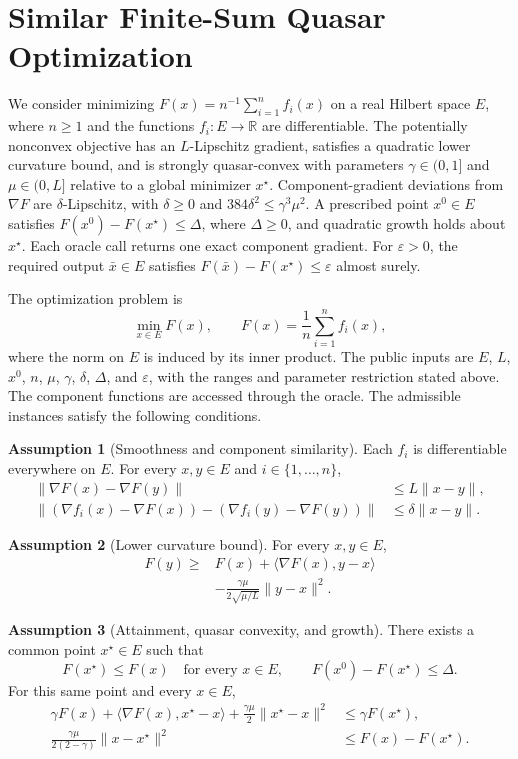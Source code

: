 \documentclass[10pt]{article}
\theoremstyle{definition}
\newtheorem{assumption}{Assumption}
\begin{document}
\section*{Similar Finite-Sum Quasar Optimization}
We consider minimizing $F(x)=n^{-1}\sum_{i=1}^{n}f_i(x)$ on a real Hilbert space $E$, where $n\geq1$ and the functions $f_i:E\to\mathbb{R}$ are differentiable. The potentially nonconvex objective has an $L$-Lipschitz gradient, satisfies a quadratic lower curvature bound, and is strongly quasar-convex with parameters $\gamma\in(0,1]$ and $\mu\in(0,L]$ relative to a global minimizer $x^\star$. Component-gradient deviations from $\nabla F$ are $\delta$-Lipschitz, with $\delta\geq0$ and $384\delta^2\leq\gamma^3\mu^2$. A prescribed point $x^0\in E$ satisfies $F(x^0)-F(x^\star)\leq\Delta$, where $\Delta\geq0$, and quadratic growth holds about $x^\star$. Each oracle call returns one exact component gradient. For $\varepsilon>0$, the required output $\bar{x}\in E$ satisfies $F(\bar{x})-F(x^\star)\leq\varepsilon$ almost surely.

The optimization problem is
\[
\min_{x\in E} F(x),
\qquad F(x)=\frac{1}{n}\sum_{i=1}^{n}f_i(x),
\]
where the norm on $E$ is induced by its inner product. The public inputs are $E$, $L$, $x^0$, $n$, $\mu$, $\gamma$, $\delta$, $\Delta$, and $\varepsilon$, with the ranges and parameter restriction stated above. The component functions are accessed through the oracle. The admissible instances satisfy the following conditions.

\begin{assumption}[Smoothness and component similarity]
Each $f_i$ is differentiable everywhere on $E$. For every $x,y\in E$ and $i\in\{1,\ldots,n\}$,
\[
\begin{aligned}
\|\nabla F(x)-\nabla F(y)\|
&\leq L\|x-y\|,\\
\| (\nabla f_i(x)-\nabla F(x))
- (\nabla f_i(y)-\nabla F(y)) \|
&\leq\delta\|x-y\|.
\end{aligned}
\]
\end{assumption}

\begin{assumption}[Lower curvature bound]
For every $x,y\in E$,
\[
\begin{aligned}
F(y)\geq {}& F(x)+\langle\nabla F(x),y-x\rangle\\
&-\frac{\gamma\mu}{2\sqrt{\mu/L}}\|y-x\|^2.
\end{aligned}
\]
\end{assumption}

\begin{assumption}[Attainment, quasar convexity, and growth]
There exists a common point $x^\star\in E$ such that
\[
F(x^\star)\leq F(x)\quad\text{for every }x\in E,
\qquad F(x^0)-F(x^\star)\leq\Delta.
\]
For this same point and every $x\in E$,
\[
\begin{aligned}
\gamma F(x)+\langle\nabla F(x),x^\star-x\rangle
+\frac{\gamma\mu}{2}\|x^\star-x\|^2
&\leq\gamma F(x^\star),\\
\frac{\gamma\mu}{2(2-\gamma)}\|x-x^\star\|^2
&\leq F(x)-F(x^\star).
\end{aligned}
\]
\end{assumption}
\end{document}
